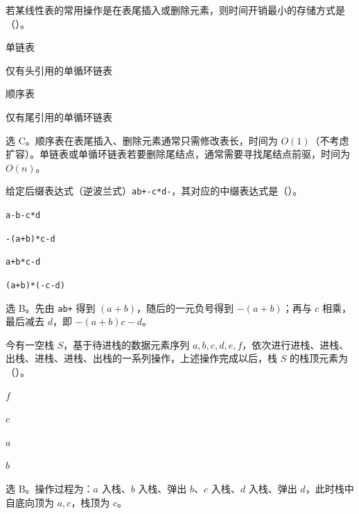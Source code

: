 \begin{question}
若某线性表的常用操作是在表尾插入或删除元素，则时间开销最小的存储方式是（\quad）。
\begin{choiceoptions}[1]
  \item 单链表
  \item 仅有头引用的单循环链表
  \item 顺序表
  \item 仅有尾引用的单循环链表
\end{choiceoptions}
\begin{solution}
选 C。顺序表在表尾插入、删除元素通常只需修改表长，时间为 $O(1)$（不考虑扩容）。单链表或单循环链表若要删除尾结点，通常需要寻找尾结点前驱，时间为 $O(n)$。
\end{solution}
\end{question}

\begin{question}
给定后缀表达式（逆波兰式）\texttt{ab+-c*d-}，其对应的中缀表达式是（\quad）。
\begin{choiceoptions}[1]
  \item \texttt{a-b-c*d}
  \item \texttt{-(a+b)*c-d}
  \item \texttt{a+b*c-d}
  \item \texttt{(a+b)*(-c-d)}
\end{choiceoptions}
\begin{solution}
选 B。先由 \texttt{ab+} 得到 $(a+b)$，随后的一元负号得到 $-(a+b)$；再与 $c$ 相乘，最后减去 $d$，即 $-(a+b)c-d$。
\end{solution}
\end{question}

\begin{question}
今有一空栈 $S$，基于待进栈的数据元素序列 $a,b,c,d,e,f$，依次进行进栈、进栈、出栈、进栈、进栈、出栈的一系列操作，上述操作完成以后，栈 $S$ 的栈顶元素为（\quad）。
\begin{choiceoptions}[4]
  \item $f$
  \item $c$
  \item $a$
  \item $b$
\end{choiceoptions}
\begin{solution}
选 B。操作过程为：$a$ 入栈、$b$ 入栈、弹出 $b$、$c$ 入栈、$d$ 入栈、弹出 $d$，此时栈中自底向顶为 $a,c$，栈顶为 $c$。
\end{solution}
\end{question}

